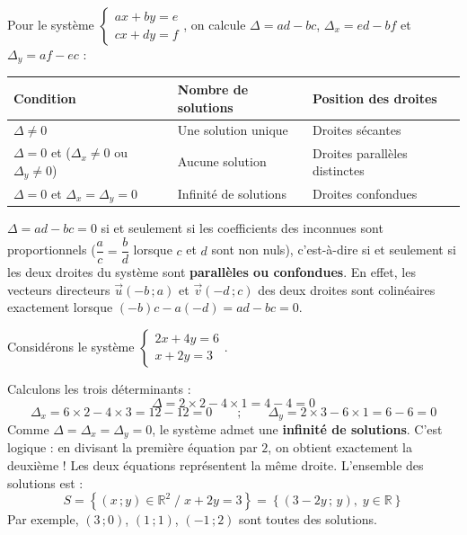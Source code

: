 \documentclass[11pt]{article}
\begin{document}
\begin{propriete}
Pour le système $\begin{cases} ax + by = e \\ cx + dy = f \end{cases}$, on calcule $\Delta = ad - bc$, $\Delta_x = ed - bf$ et $\Delta_y = af - ec$ :
\begin{center}
\begin{tabularx}{\linewidth}{|l|X|X|}
\hline
\rowcolor{popblueL} \textbf{Condition} & \textbf{Nombre de solutions} & \textbf{Position des droites} \\
\hline
$\Delta \neq 0$ & Une solution unique & Droites sécantes \\
\hline
$\Delta = 0$ et ($\Delta_x \neq 0$ ou $\Delta_y \neq 0$) & Aucune solution & Droites parallèles distinctes \\
\hline
$\Delta = 0$ et $\Delta_x = \Delta_y = 0$ & Infinité de solutions & Droites confondues \\
\hline
\end{tabularx}
\end{center}
\end{propriete}

\begin{propriete}
$\Delta = ad - bc = 0$ si et seulement si les coefficients des inconnues sont proportionnels ($\dfrac{a}{c} = \dfrac{b}{d}$ lorsque $c$ et $d$ sont non nuls), c'est-à-dire si et seulement si les deux droites du système sont \textbf{parallèles ou confondues}. En effet, les vecteurs directeurs $\vec{u}(-b\,;a)$ et $\vec{v}(-d\,;c)$ des deux droites sont colinéaires exactement lorsque $(-b)c - a(-d) = ad - bc = 0$.
\end{propriete}

\begin{exemplebox}
Considérons le système $\begin{cases} 2x + 4y = 6 \\ x + 2y = 3 \end{cases}$.

Calculons les trois déterminants :
\[
\Delta = 2 \times 2 - 4 \times 1 = 4 - 4 = 0
\]
\[
\Delta_x = 6 \times 2 - 4 \times 3 = 12 - 12 = 0
\qquad ; \qquad
\Delta_y = 2 \times 3 - 6 \times 1 = 6 - 6 = 0
\]
Comme $\Delta = \Delta_x = \Delta_y = 0$, le système admet une \textbf{infinité de solutions}. C'est logique : en divisant la première équation par $2$, on obtient exactement la deuxième ! Les deux équations représentent la même droite. L'ensemble des solutions est :
\[
S = \left\lbrace (x\,;y) \in \mathbb{R}^2 \; / \; x + 2y = 3 \right\rbrace = \left\lbrace (3 - 2y\,;\,y),\; y \in \mathbb{R} \right\rbrace
\]
Par exemple, $(3\,;0)$, $(1\,;1)$, $(-1\,;2)$ sont toutes des solutions.
\end{exemplebox}
\end{document}
